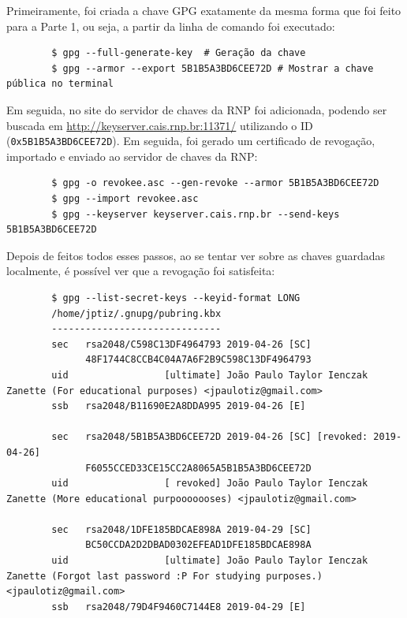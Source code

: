 \documentclass{article}
\begin{document}
    Primeiramente, foi criada a chave GPG exatamente da mesma forma que foi
    feito para a Parte 1, ou seja, a partir da linha de comando foi executado:

    \begin{verbatim}
        $ gpg --full-generate-key  # Geração da chave
        $ gpg --armor --export 5B1B5A3BD6CEE72D # Mostrar a chave pública no terminal
    \end{verbatim}

    Em seguida, no site do servidor de chaves da RNP foi adicionada, podendo
    ser buscada em \url{http://keyserver.cais.rnp.br:11371/} utilizando o ID
    (\texttt{0x5B1B5A3BD6CEE72D}). Em seguida, foi gerado um certificado de
    revogação, importado e enviado ao servidor de chaves da RNP:

    \begin{verbatim}
        $ gpg -o revokee.asc --gen-revoke --armor 5B1B5A3BD6CEE72D
        $ gpg --import revokee.asc
        $ gpg --keyserver keyserver.cais.rnp.br --send-keys 5B1B5A3BD6CEE72D
    \end{verbatim}

    Depois de feitos todos esses passos, ao se tentar ver sobre as chaves
    guardadas localmente, é possível ver que a revogação foi satisfeita:

    \begin{verbatim}
        $ gpg --list-secret-keys --keyid-format LONG
        /home/jptiz/.gnupg/pubring.kbx
        ------------------------------
        sec   rsa2048/C598C13DF4964793 2019-04-26 [SC]
              48F1744C8CCB4C04A7A6F2B9C598C13DF4964793
        uid                 [ultimate] João Paulo Taylor Ienczak Zanette (For educational purposes) <jpaulotiz@gmail.com>
        ssb   rsa2048/B11690E2A8DDA995 2019-04-26 [E]

        sec   rsa2048/5B1B5A3BD6CEE72D 2019-04-26 [SC] [revoked: 2019-04-26]
              F6055CCED33CE15CC2A8065A5B1B5A3BD6CEE72D
        uid                 [ revoked] João Paulo Taylor Ienczak Zanette (More educational purpooooooses) <jpaulotiz@gmail.com>

        sec   rsa2048/1DFE185BDCAE898A 2019-04-29 [SC]
              BC50CCDA2D2DBAD0302EFEAD1DFE185BDCAE898A
        uid                 [ultimate] João Paulo Taylor Ienczak Zanette (Forgot last password :P For studying purposes.) <jpaulotiz@gmail.com>
        ssb   rsa2048/79D4F9460C7144E8 2019-04-29 [E]
    \end{verbatim}
\end{document}
